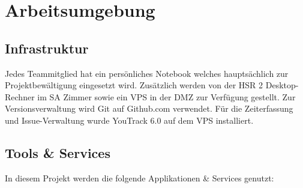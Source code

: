 \section{Arbeitsumgebung}
\label{sec:Arbeitsumgebung}

\subsection{Infrastruktur}
Jedes Teammitglied hat ein persönliches Notebook welches hauptsächlich zur Projektbewältigung eingesetzt wird. Zusätzlich werden von der \acs{HSR} 2 Desktop-Rechner im \acs{SA} Zimmer sowie ein \acs{VPS} in der DMZ zur Verfügung gestellt.
Zur Versionsverwaltung wird Git auf Github.com verwendet. Für die Zeiterfassung und Issue-Verwaltung wurde YouTrack 6.0 auf dem \acs{VPS} installiert.

\subsection{Tools \& Services}
In diesem Projekt werden die folgende Applikationen \& Services genutzt:

